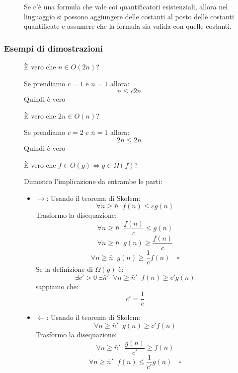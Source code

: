 \documentclass[a4paper]{article}
\begin{document}
\begin{figure}[H]
  \begin{theorem}
    Se c'è una formula che vale coi quantificatori esistenziali, allora nel linguaggio
    si possono aggiungere delle costanti al posto delle costanti quantificate e assumere
    che la formula sia valida con quelle costanti.
  \end{theorem}
\end{figure}

\subsubsection{Esempi di dimostrazioni}
\begin{figure}[H]
  \begin{example}
    È vero che \( n \in O(2n) \)?

    \noindent
    Se prendiamo \( c = 1 \) e \( \bar{n} = 1 \) allora:
    \[
    n \le c2n
    \] 
    Quindi è vero
  \end{example}

\end{figure}
\begin{figure}[H]
\begin{example}
  È vero che \( 2n \in O(n) \)?

  \noindent
  Se prendiamo \( c = 2 \) e \( \bar{n} = 1 \) allora:
  \[
    2n \le 2n
  \] 
  Quindi è vero
\end{example}
\end{figure}
\begin{figure}[H]
  \begin{example}
    È vero che \( f \in O(g) \iff g \in \Omega(f) \)?

    \noindent
    Dimostro l'implicazione da entrambe le parti:
    \begin{itemize}
      \item \( \to \): Usando il teorema di Skolem:
        \[
          \forall n \ge \bar{n}\;\; f(n) \le cg(n)
        \] 
        Trasformo la disequazione:
        \[
          \forall n \ge \bar{n}\;\; \frac{f(n)}{c} \le g(n)
        \] 
        \[
          \forall n \ge \bar{n}\;\; g(n) \ge \frac{f(n)}{c}
        \] 
        \[
          \forall n \ge \bar{n}\;\; g(n) \ge \frac{1}{c} f(n) \quad \square
        \] 
        Se la definizione di \( \Omega(g) \) è:
        \[
          \exists c' > 0\; \exists \bar{n}'\;\; \forall n \ge \bar{n}'\;\; f(n) \ge c'g(n)
        \]
        sappiamo che:
        \[
          c' = \frac{1}{c}
        \] 
      \item \( \leftarrow \): Usando il teorema di Skolem:
        \[
          \forall n \ge \bar{n}'\;\; g(n) \ge c'f(n)
        \] 
        Trasformo la disequazione:
        \[
          \forall n \ge \bar{n}'\;\; \frac{g(n)}{c'}\ge f(n)
        \] 
        \[
          \forall n \ge \bar{n}'\;\; f(n) \le \frac{1}{c'} g(n) \quad \square
        \] 
    \end{itemize}
  \end{example}
\end{figure}
\end{document}
